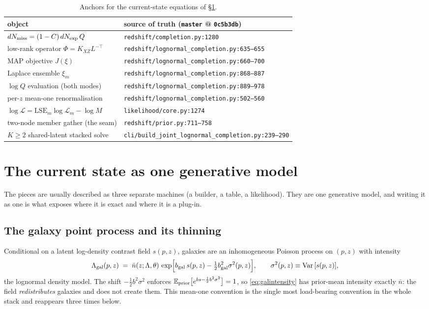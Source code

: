 \begin{table}[t]
\centering\small
\begin{tabular}{ll}
\toprule
object & source of truth (\texttt{master} @ \texttt{0c5b3db})\\
\midrule
$dN_{\rm miss}=(1-C)\,dN_{\rm exp}\,Q$ & \texttt{redshift/completion.py:1280}\\
low-rank operator $\Phi=K_{XZ}L^{-\!\top}$ & \texttt{redshift/lognormal\_completion.py:635--655}\\
MAP objective $J(\xi)$ & \texttt{redshift/lognormal\_completion.py:660--700}\\
Laplace ensemble $\xi_m$ & \texttt{redshift/lognormal\_completion.py:868--887}\\
$\log Q$ evaluation (both modes) & \texttt{redshift/lognormal\_completion.py:889--978}\\
per-$z$ mean-one renormalisation & \texttt{redshift/lognormal\_completion.py:502--560}\\
$\log\mathcal L=\mathrm{LSE}_m\log\mathcal L_m-\log M$ & \texttt{likelihood/core.py:1274}\\
two-node member gather (the seam) & \texttt{redshift/prior.py:711--758}\\
$K\!\ge\!2$ shared-latent stacked solve & \texttt{cli/build\_joint\_lognormal\_completion.py:239--290}\\
\bottomrule
\end{tabular}
\caption{Anchors for the current-state equations of \S\ref{sec:current}.}
\end{table}

\section{The current state as one generative model}
\label{sec:current}

The pieces are usually described as three separate machines (a builder, a
table, a likelihood).  They are one generative model, and writing it as one is
what exposes where it is exact and where it is a plug-in.

\subsection{The galaxy point process and its thinning}

Conditional on a latent log-density contrast field $s(p,z)$, galaxies are an
inhomogeneous Poisson process on $(p,z)$ with intensity
\begin{equation}
  \Lambda_{\rm gal}(p,z)\;=\;\bar n(z;\Lambda,\theta)\,
  \exp\!\Big[b_{\rm gal}\,s(p,z)-\tfrac12 b_{\rm gal}^2\sigma^2(p,z)\Big],
  \qquad \sigma^2(p,z)\equiv\mathrm{Var}\,[s(p,z)],
  \label{eq:galintensity}
\end{equation}
the lognormal density model.  The shift $-\tfrac12b^2\sigma^2$ enforces
$\mathbb E_{\rm prior}\big[e^{b s-\frac12 b^2\sigma^2}\big]=1$, so
\eqref{eq:galintensity} has prior-mean intensity exactly $\bar n$: the field
\emph{redistributes} galaxies and does not create them.  This mean-one
convention is the single most load-bearing convention in the whole stack and
reappears three times below.

